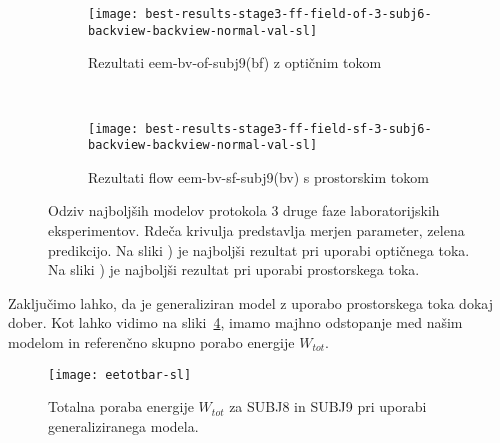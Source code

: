 \begin{figure}[!htbp]
	\centering
	\begin{subfigure}[t]{0.45\columnwidth}
		\texttt{[image: best-results-stage3-ff-field-of-3-subj6-backview-backview-normal-val-sl]}
		\caption{Rezultati eem-bv-of-subj9(bf) z optičnim tokom}
		\label{fig:field-of-3}
	\end{subfigure}
	~
	\begin{subfigure}[t]{0.45\columnwidth}
		\texttt{[image: best-results-stage3-ff-field-sf-3-subj6-backview-backview-normal-val-sl]}
		\caption{Rezultati flow eem-bv-sf-subj9(bv) s prostorskim tokom}
		\label{fig:field-sf-3}
	\end{subfigure}
	\caption[Odziv SUBJ9 modelov protokola 3 2. faze lab. eksperimentov]{Odziv najboljših modelov protokola 3 druge faze laboratorijskih eksperimentov. Rdeča krivulja predstavlja merjen parameter, zelena predikcijo. Na sliki ) je najboljši rezultat pri uporabi optičnega toka. Na sliki ) je najboljši rezultat pri uporabi prostorskega toka.}
	\label{fig:field-3}
\end{figure}


Zaključimo lahko, da je generaliziran model z uporabo prostorskega toka dokaj dober. Kot lahko vidimo na sliki~\ref{fig:stage2-field3-tot}, imamo majhno odstopanje med našim modelom in referenčno skupno porabo energije $W_{tot}$.

\begin{comment}
\begin{table}[!htbp]
	\centering
	\begin{tabular}{l S[table-format=3.2, round-mode=places, round-precision=2] S[table-format=3.2, round-mode=places, round-precision=2]}
		\toprule
		& \theadc{$\mathbf{W_{tot}}$ [kcal]} \\
		\cmidrule{2-3}
		\textbf{Model} & \thead{OF} & \thead{SF} \\
		\midrule
		\tdata{stage2-field-3-tot}
		\bottomrule
	\end{tabular}
	\caption[Totalna poraba energije za protokol 3 2. terenske faze]{Totalna poraba energije za protokol 3 2. terenske faze.}
	\label{tab:stage2-field-3-tot}
\end{table}
\end{comment}

\begin{figure}[!htbp]
	\centering
	\texttt{[image: eetotbar-sl]}
	\caption{Totalna poraba energije $W_{tot}$ za SUBJ8 in SUBJ9 pri uporabi generaliziranega modela.}
	\label{fig:stage2-field3-tot}
\end{figure}





